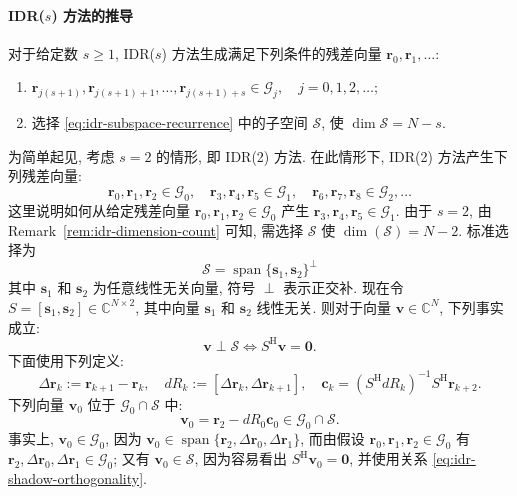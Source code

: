 \paragraph{{IDR($s$) 方法的推导}}\label{subsec:idr-derivation}\mbox{}\par
{对于给定数 $s\ge1$, IDR($s$) 方法生成满足下列条件的残差向量 $\bm r_0,\bm r_1,\ldots$:}
\begin{enumerate}
\item $\bm r_{j(s+1)},\bm r_{j(s+1)+1},\ldots,\bm r_{j(s+1)+s}\in\mathcal G_j,\quad j=0,1,2,\ldots$;
\item{选择 \eqref{eq:idr-subspace-recurrence} 中的子空间 $\mathcal S$, 使 $\dim\mathcal S=N-s$.}
\end{enumerate}
{为简单起见, 考虑 $s=2$ 的情形, 即 IDR(2) 方法. 在此情形下, IDR(2) 方法产生下列残差向量:}
\[\bm r_0,\bm r_1,\bm r_2\in\mathcal G_0,\quad\bm r_3,\bm r_4,\bm r_5\in\mathcal G_1,\quad\bm r_6,\bm r_7,\bm r_8\in\mathcal G_2,\ldots\]
{这里说明如何从给定残差向量 $\bm r_0,\bm r_1,\bm r_2\in\mathcal G_0$ 产生 $\bm r_3,\bm r_4,\bm r_5\in\mathcal G_1$. 由于 $s=2$, 由 Remark\ \ref{rem:idr-dimension-count} 可知, 需选择 $\mathcal S$ 使 $\dim(\mathcal S)=N-2$. 标准选择为}
\begin{equation}\label{eq:idr-shadow-complement}\mathcal S=\operatorname{span}\{\bm s_1,\bm s_2\}^{\perp}\end{equation}
{其中 $\bm s_1$ 和 $\bm s_2$ 为任意线性无关向量, 符号 $\perp$ 表示正交补.}
{现在令 $S=[\bm s_1,\bm s_2]\in\mathbb C^{N\times2}$, 其中向量 $\bm s_1$ 和 $\bm s_2$ 线性无关. 则对于向量 $\bm v\in\mathbb C^N$, 下列事实成立:}
\begin{equation}\label{eq:idr-shadow-orthogonality}\bm v\perp\mathcal S\Leftrightarrow S^{\mathrm H}\bm v=\bm0.\end{equation}
{下面使用下列定义:}
\begin{equation}\label{eq:idr-residual-differences}\Delta\bm r_k:=\bm r_{k+1}-\bm r_k,\quad dR_k:=[\Delta\bm r_k,\Delta\bm r_{k+1}],\quad\bm c_k=(S^{\mathrm H}dR_k)^{-1}S^{\mathrm H}\bm r_{k+2}.\end{equation}
{下列向量 $\bm v_0$ 位于 $\mathcal G_0\cap\mathcal S$ 中:}
\begin{equation}\label{eq:idr-first-projected-vector}\bm v_0=\bm r_2-dR_0\bm c_0\in\mathcal G_0\cap\mathcal S.\end{equation}
{事实上, $\bm v_0\in\mathcal G_0$, 因为 $\bm v_0\in\operatorname{span}\{\bm r_2,\Delta\bm r_0,\Delta\bm r_1\}$, 而由假设 $\bm r_0,\bm r_1,\bm r_2\in\mathcal G_0$ 有 $\bm r_2,\Delta\bm r_0,\Delta\bm r_1\in\mathcal G_0$; 又有 $\bm v_0\in\mathcal S$, 因为容易看出 $S^{\mathrm H}\bm v_0=\bm0$, 并使用关系 \eqref{eq:idr-shadow-orthogonality}.}
